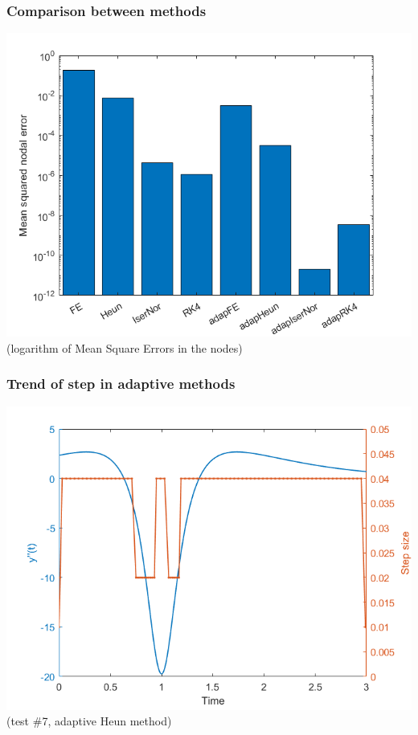 \documentclass{beamer}
\begin{document}
\begin{frame} %
\frametitle{Comparison between methods}
\begin{center}
	\includegraphics[width=0.8\linewidth]{etc/MSE.png} \\
	(logarithm of Mean Square Errors in the nodes)
\end{center}
\end{frame}


\begin{frame} %
	\frametitle{Trend of step in adaptive methods}
	\begin{center}
		\includegraphics[width=0.8\linewidth]{etc/step_history_7_adapHeun.png} \\
		(test \#7, adaptive Heun method)
	\end{center}	
\end{frame}
\end{document}
